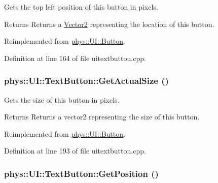 Gets the top left position of this button in pixels. 

\begin{DoxyReturn}{Returns}
Returns a \hyperlink{classphys_1_1Vector2}{Vector2} representing the location of this button. 
\end{DoxyReturn}


Reimplemented from \hyperlink{classphys_1_1UI_1_1Button_a0b991ada87707d8d951dae7c0e3246f6}{phys::UI::Button}.



Definition at line 164 of file uitextbutton.cpp.

\hypertarget{classphys_1_1UI_1_1TextButton_a062b31c199f875d4f825f6be1d11fb55}{
\subsubsection[{GetActualSize}]{ phys::UI::TextButton::GetActualSize ()}}
\label{df/d03/classphys_1_1UI_1_1TextButton_a062b31c199f875d4f825f6be1d11fb55}


Gets the size of this button in pixels. 

\begin{DoxyReturn}{Returns}
Returns a vector2 representing the size of this button. 
\end{DoxyReturn}


Reimplemented from \hyperlink{classphys_1_1UI_1_1Button_ab6640af433afe96d5f6bd7016986d73f}{phys::UI::Button}.



Definition at line 193 of file uitextbutton.cpp.

\hypertarget{classphys_1_1UI_1_1TextButton_a09768e0666a109b7d35fd8b78240cfd3}{
\subsubsection[{GetPosition}]{ phys::UI::TextButton::GetPosition ()}}
\label{df/d03/classphys_1_1UI_1_1TextButton_a09768e0666a109b7d35fd8b78240cfd3}


